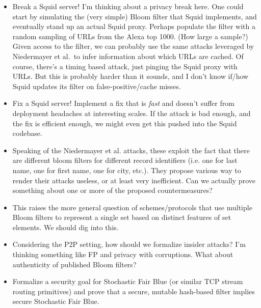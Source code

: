 \begin{itemize}
\item Break a Squid server!  I'm thinking about a privacy break here.  One could start by simulating the (very simple) Bloom filter that Squid implements, and eventually stand up an actual Squid proxy.  Perhaps populate the filter with a random sampling of URLs from the Alexa top 1000.  (How large a sample?)  Given access to the filter, we can probably use the same attacks leveraged by Niedermayer et al.\ to infer information about which URLs are cached.  Of course, there's a timing based attack, just pinging the Squid proxy with URLs.   But this is probably harder than it sounds, and I don't know if/how Squid updates its filter on false-positive/cache misses.  

\item Fix a Squid server!  Implement a fix that is \emph{fast} and doesn't suffer from deployment headaches at interesting scales.  If the attack is bad enough, and the fix is efficient enough, we might even get this pushed into the Squid codebase. 

\item Speaking of the Niedermayer et al. attacks, these exploit the fact that there are different bloom filters for different record identifiers (i.e. one for last name, one for first name, one for city, etc.).  They propose various way to render their attacks useless, or at least very inefficient.  Can we actually prove something about one or more of the proposed countermeasures?  

\item This raises the more general question of schemes/protocols that use multiple Bloom filters to represent a single set based on distinct features of set elements.  We should dig into this.

\item Considering the P2P setting, how should we formalize insider attacks?  I'm thinking something like FP and privacy with corruptions.  What about authenticity of published Bloom filters?

\item Formalize a security goal for Stochastic Fair Blue (or similar TCP stream routing primitives) and prove that a secure, mutable hash-based filter implies secure Stochastic Fair Blue.


\end{itemize}
